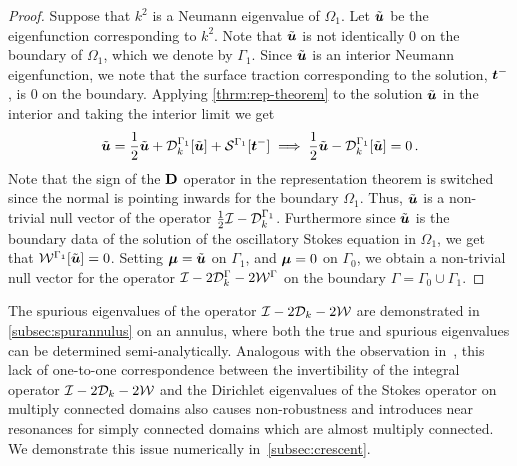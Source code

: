 
\begin{proof}
  Suppose that $k^2$ is a Neumann eigenvalue of $\Omega_{1}$.
  Let $\tilde{{\boldsymbol u}}$ be the eigenfunction corresponding to $k^2$. 
  Note that $\tilde{{\boldsymbol u}}$ is not identically $0$ on the boundary
  of $\Omega_{1}$, which we denote by $\Gamma_1$.
  Since $\tilde{{\boldsymbol u}}$ is an interior Neumann eigenfunction, we note that
  the surface traction corresponding to the solution, ${\boldsymbol t}^{-}$, is $0$
  on the boundary.
  Applying \cref{thrm:rep-theorem} to the
  solution $\tilde{{\boldsymbol u}}$ in the interior
  and taking the interior limit we get
\begin{equation}
\tilde{{\boldsymbol u}} = \frac{1}{2}\tilde{{\boldsymbol u}} + {\mathcal D}^{\Gamma_{1}}_{k}[\tilde{{\boldsymbol u}}] +
{\mathcal S}^{\Gamma_{1}} [{\boldsymbol t}^{-}] \implies \frac{1}{2} \tilde{{\boldsymbol u}} - {\mathcal D}^{\Gamma_{1}}_{k}[\tilde{{\boldsymbol u}}]
= 0\, .
\end{equation}
Note that the sign of the ${\bf D}$ operator in the
representation theorem is switched since the normal
is pointing inwards for the boundary $\Omega_{1}$.
Thus, $\tilde{{\boldsymbol u}}$ is a non-trivial null vector of the operator 
$\frac{1}{2}\mathcal I - {\mathcal D}^{\Gamma_{1}}_{k}$. 
Furthermore since $\tilde{{\boldsymbol u}}$ is the boundary data of 
the solution of the oscillatory Stokes equation
in $\Omega_{1}$, we get that ${\mathcal W}^{\Gamma_{1}}[\tilde{{\boldsymbol u}}] = 0$.
Setting ${\boldsymbol \mu} = \tilde{{\boldsymbol u}}$ on $\Gamma_{1}$, and
${\boldsymbol \mu} = 0$ on $\Gamma_{0}$, we obtain a non-trivial null
vector for the operator $\mathcal I - 2{\mathcal D}^{\Gamma}_{k} -2{\mathcal W}^{\Gamma}$
on the boundary $\Gamma = \Gamma_{0} \cup \Gamma_{1}$.
\end{proof}

The spurious eigenvalues of the operator $\mathcal I-2{\mathcal D}_{k}-2{\mathcal W}$
are demonstrated in \cref{subsec:spurannulus} on an annulus,
where both the true and spurious eigenvalues can be
determined semi-analytically. 
Analogous with the observation in~\cite{zhao2015robust},
this lack of one-to-one correspondence between
the invertibility of the integral operator $\mathcal I - 2{\mathcal D}_{k} - 2{\mathcal W}$
and the Dirichlet eigenvalues of the Stokes operator on multiply
connected domains also causes non-robustness and introduces near 
resonances for simply connected domains
which are almost multiply connected.
We demonstrate this issue numerically
in~\cref{subsec:crescent}.

